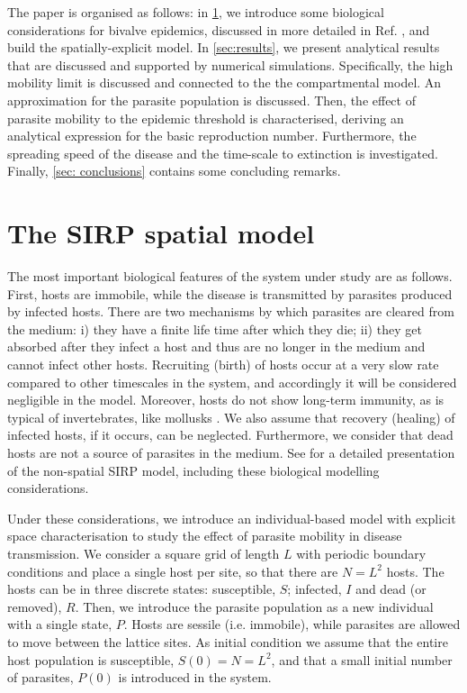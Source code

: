 The paper is organised as follows: in \cref{sec:model}, we introduce some
biological considerations for bivalve epidemics, discussed in more detailed in
Ref. \cite{GimenezRomero2021}, and build the spatially-explicit model. In
\cref{sec:results}, we present analytical results that are discussed and
supported by numerical simulations. Specifically, the high mobility limit is
discussed and connected to the the compartmental model. An approximation for
the parasite population is discussed. Then, the effect of parasite mobility to
the epidemic threshold is characterised, deriving an analytical expression for
the basic reproduction number. Furthermore, the spreading speed of the disease
and the time-scale to extinction is investigated. Finally, \cref{sec:
    conclusions} contains some concluding remarks.

\section{The SIRP spatial model} \label{sec:model}

The most important biological features of the system under study are as
follows. First, hosts are immobile, while the disease is transmitted by
parasites produced by infected hosts. There are two mechanisms by which
parasites are cleared from the medium: i) they have a finite life time after
which they die; ii) they get absorbed after they infect a host and thus are no
longer in the medium and cannot infect other hosts. Recruiting (birth) of hosts
occur at a very slow rate compared to other timescales in the system, and
accordingly it will be considered negligible in the model. Moreover, hosts do
not show long-term immunity, as is typical of invertebrates, like mollusks
\cite{Powell2015}. We also assume that recovery (healing) of infected hosts, if
it occurs, can be neglected. Furthermore, we consider that dead hosts are not a
source of parasites in the medium. See \cite{GimenezRomero2021} for a detailed
presentation of the non-spatial SIRP model, including these biological
modelling considerations.

Under these considerations, we introduce an individual-based model with
explicit space characterisation to study the effect of parasite mobility in
disease transmission. We consider a square grid of length $L$ with periodic
boundary conditions and place a single host per site, so that there are $N=L^2$
hosts. The hosts can be in three discrete states: susceptible, $S$; infected,
$I$ and dead (or removed), $R$. Then, we introduce the parasite population as a
new individual with a single state, $P$. Hosts are sessile (i.e. immobile),
while parasites are allowed to move between the lattice sites. As initial
condition we assume that the entire host population is susceptible,
$S(0)=N=L^2$, and that a small initial number of parasites, $P(0)$ is
introduced in the system.

